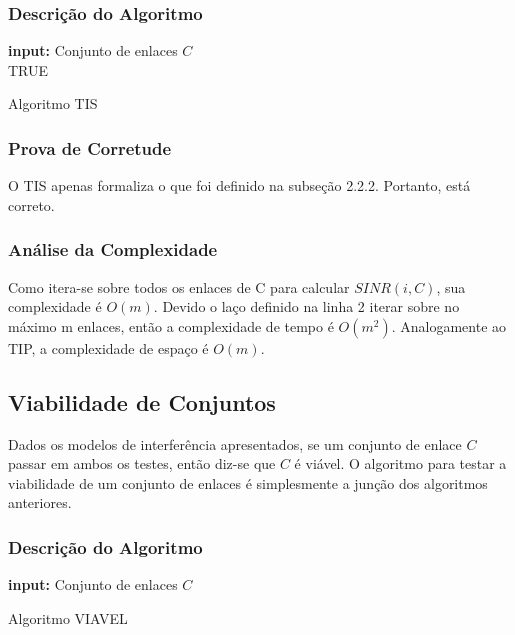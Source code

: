 \subsubsection{Descrição do Algoritmo}

\begin{algorithm}[h]
	\SetVline
	{\bf input:} Conjunto de enlaces $C$\\
	\Return TRUE
\caption{Algoritmo TIS}
\label{alg:tis}
\end{algorithm}

\subsubsection{Prova de Corretude}

O TIS apenas formaliza o que foi definido na subseção 2.2.2. Portanto, está correto.

\subsubsection{Análise da Complexidade}

Como itera-se sobre todos os enlaces de C para calcular $SINR(i,C)$, sua complexidade é $O(m)$. Devido o laço definido na linha 2 iterar sobre no máximo m enlaces, então a complexidade de tempo é $O(m^2)$. Analogamente ao TIP, a complexidade de espaço é $O(m)$.

\subsection{Viabilidade de Conjuntos}

Dados os modelos de interferência apresentados, se um conjunto de enlace $C$ passar em ambos os testes, então diz-se que $C$ é viável. O algoritmo para testar a viabilidade de um conjunto de enlaces é simplesmente a junção dos algoritmos anteriores.

\subsubsection{Descrição do Algoritmo}

\begin{algorithm}[h]
	\SetVline
	{\bf input:} Conjunto de enlaces $C$\\
\caption{Algoritmo VIAVEL}
\label{alg:viavel}
\end{algorithm}

